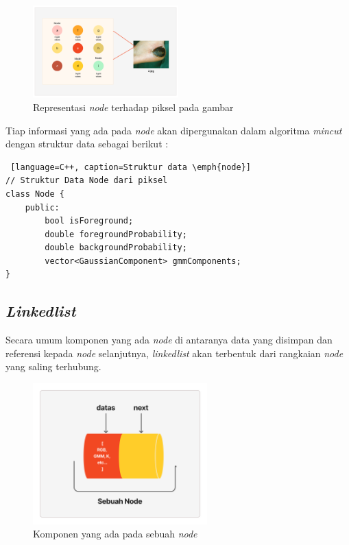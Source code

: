 \begin{figure}[H]
	\centering{}
	\includegraphics[width=0.5\textwidth]{gambar/node_representasi.png}
	\caption{Representasi \emph{node} terhadap piksel pada gambar}
\end{figure}

Tiap informasi yang ada pada \emph{node} akan dipergunakan dalam algoritma \emph{mincut}
dengan struktur data sebagai berikut :

\begin{lstlisting} [language=C++, caption=Struktur data \emph{node}]
// Struktur Data Node dari piksel
class Node {
    public:
        bool isForeground;
        double foregroundProbability;
        double backgroundProbability;
        vector<GaussianComponent> gmmComponents;
}  
\end{lstlisting}

\subsection{\emph{Linkedlist}} 
Secara umum komponen yang ada \emph{node} di antaranya data yang disimpan dan 
referensi kepada \emph{node} selanjutnya, \emph{linkedlist} akan terbentuk 
dari rangkaian \emph{node} yang saling terhubung.

\begin{figure}[H]
	\centering{}
	\includegraphics[width=0.6\textwidth]{gambar/node_komponen.png}
	\caption{Komponen yang ada pada sebuah \emph{node}}
\end{figure}

